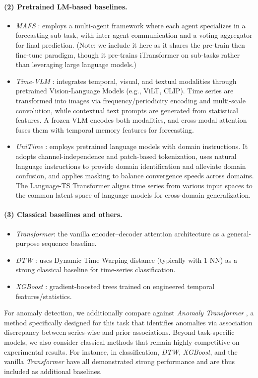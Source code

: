\paragraph{(2) Pretrained LM-based baselines.}
\begin{itemize}[leftmargin=*, itemsep=2pt]
\item \textit{MAFS} \citep{huang2025many}: employs a multi-agent framework where each agent specializes in a forecasting sub-task, with inter-agent communication and a voting aggregator for final prediction. (Note: we include it here as it shares the pre-train then fine-tune paradigm, though it pre-trains iTransformer on sub-tasks rather than leveraging large language models.)
\item \textit{Time-VLM} \citep{zhong2025time}: integrates temporal, visual, and textual modalities through pretrained Vision-Language Models (e.g., ViLT, CLIP). Time series are transformed into images via frequency/periodicity encoding and multi-scale convolution, while contextual text prompts are generated from statistical features. A frozen VLM encodes both modalities, and cross-modal attention fuses them with temporal memory features for forecasting.
\item \textit{UniTime} \citep{liu2024unitime}: employs pretrained language models with domain instructions. It adopts channel-independence and patch-based tokenization, uses natural language instructions to provide domain identification and alleviate domain confusion, and applies masking to balance convergence speeds across domains. The Language-TS Transformer aligns time series from various input spaces to the common latent space of language models for cross-domain generalization.
\end{itemize}

\paragraph{(3) Classical baselines and others.}
\begin{itemize}[leftmargin=*, itemsep=1pt]
\item\textit{Transformer}\citep{vaswani2017attention}: the vanilla encoder--decoder attention architecture as a general-purpose sequence baseline.
\item \textit{DTW} \citep{Berndt1994UsingDT}: uses Dynamic Time Warping distance (typically with 1-NN) as a strong classical baseline for time-series classification.
\item \textit{XGBoost} \citep{Chen2016XGBoostAS}: gradient-boosted trees trained on engineered temporal features/statistics.
\end{itemize}
For anomaly detection, we additionally compare against \textit{Anomaly Transformer} \citep{xu2021anomaly}, a method specifically designed for this task that identifies anomalies via association discrepancy between series-wise and prior associations. Beyond task-specific models, we also consider classical methods that remain highly competitive on experimental results. For instance, in classification, \textit{DTW}, \textit{XGBoost}, and the vanilla \textit{Transformer} have all demonstrated strong performance and are thus included as additional baselines.

